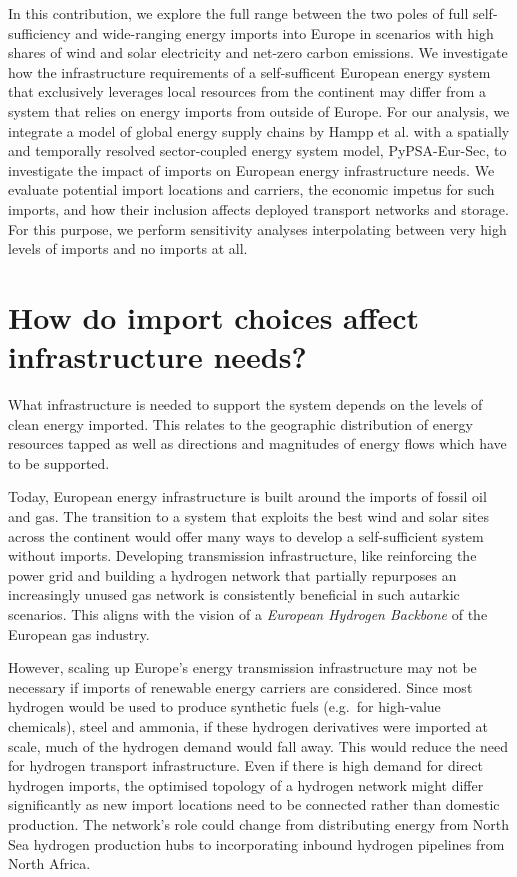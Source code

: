 \documentclass[10pt,5p,reversenotenum,lefttitle]{elsarticle}
\begin{document}
In this contribution, we explore the full range between the two poles of full
self-sufficiency and wide-ranging energy imports into Europe in scenarios with
high shares of wind and solar electricity and net-zero carbon emissions. We
investigate how the infrastructure requirements of a self-sufficent European
energy system that exclusively leverages local resources from the continent may
differ from a system that relies on energy imports from outside of Europe. For
our analysis, we integrate a model of global energy supply chains by Hampp et
al.\cite{hamppImportOptions2021} with a spatially and temporally resolved
sector-coupled energy system model,
PyPSA-Eur-Sec,\cite{PyPSAEurSecSectorCoupled} to investigate the impact of
imports on European energy infrastructure needs. We evaluate potential import
locations and carriers, the economic impetus for such imports, and how their
inclusion affects deployed transport networks and storage. For this purpose, we
perform sensitivity analyses interpolating between very high levels of imports
and no imports at all.

\section*{How do import choices affect infrastructure needs?}

What infrastructure is needed to support the system depends on the levels of
clean energy imported. This relates to the geographic distribution of energy
resources tapped as well as directions and magnitudes of energy flows which have
to be supported.

Today, European energy infrastructure is built around the imports of fossil oil
and gas. The transition to a system that exploits the best wind and solar sites
across the continent would offer many ways to develop a self-sufficient system
without imports.\cite{pickeringDiversityOptions2022,brownSynergiesSector2018}
Developing transmission infrastructure, like reinforcing the power grid and
building a hydrogen network that partially repurposes an increasingly unused gas
network is consistently beneficial in such autarkic
scenarios.\cite{neumannBenefitsHydrogen2022a,wetzelGreenEnergy2022,victoriaSpeedTechnological2022}
This aligns with the vision of a \textit{European Hydrogen Backbone} of the
European gas industry.
\cite{gasforclimateEuropeanHydrogen2020,gasforclimateEuropeanHydrogen2022}

However, scaling up Europe's energy transmission infrastructure may not be
necessary if imports of renewable energy carriers are considered. Since most
hydrogen would be used to produce synthetic fuels (e.g.~for high-value
chemicals), steel and ammonia,\cite{neumannBenefitsHydrogen2022a} if these
hydrogen derivatives were imported at scale, much of the hydrogen demand would
fall away. This would reduce the need for hydrogen transport infrastructure.
Even if there is high demand for direct hydrogen imports, the optimised topology
of a hydrogen network might differ significantly as new import locations need to
be connected rather than domestic production. The network's role could change
from distributing energy from North Sea hydrogen production hubs to
incorporating inbound hydrogen pipelines from North Africa.
\end{document}
